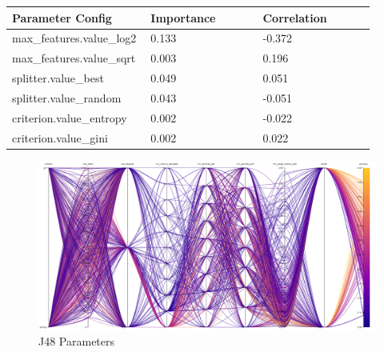 \documentclass[11pt]{article}
\begin{document}
\begin{appendices}
\begin{table}[ht]
\begin{tabular}{|p{0.3\linewidth} | p{0.3\linewidth}| p{0.3\linewidth}|}
    \end{tabular}
  \end{table}\label{J48_ParamImp1}

  \begin{table}[ht]
    \centering
    \begin{tabular}{|p{0.3\linewidth} | p{0.3\linewidth}| p{0.3\linewidth}|} 
      \hline
      \textbf{Parameter Config}  & \textbf{Importance} & \textbf{Correlation} \\ \hline
        max\_features.value\_log2 & 0.133 & -0.372 \\ \hline
        max\_features.value\_sqrt & 0.003 & 0.196 \\ \hline
        splitter.value\_best & 0.049 & 0.051 \\ \hline
        splitter.value\_random & 0.043 & -0.051 \\ \hline
        criterion.value\_entropy & 0.002 & -0.022 \\ \hline
        criterion.value\_gini & 0.002 & 0.022 \\ \hline

    \end{tabular}
  \end{table}\label{J48_ParamImp2}

\begin{figure}[h]
  \caption {J48 Parameters} \label{ParallelCoordJ48}
  \centering 
  \includegraphics[width = \textwidth, height = \textwidth, keepaspectratio]{Images/J48 ParallelCoordGraph.png}
\end{figure}




\end{appendices}
\end{document}
